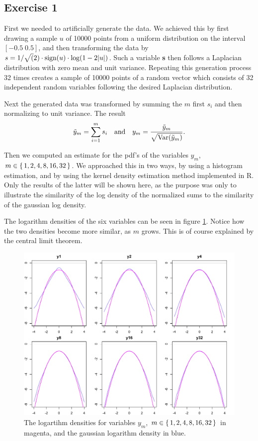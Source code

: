\documentclass{article}
\begin{document}
\subsection{Exercise 1}
First we needed to artificially generate the data. We achieved this by
first drawing a sample $u$ of 10000 points from a uniform distribution on
the interval $[-0.5 \; 0.5]$, and then transforming the data by $s =
1/\sqrt(2) \cdot \textup{sign}(u) \cdot \log(1-2|u|)$. Such a variable
\textbf{s} then follows a Laplacian distribution with zero mean and
unit variance. Repeating this generation process 32 times creates a
sample of 10000 points of a random vector which consists of 32 independent random
variables following the desired Laplacian distribution.

Next the generated data was transformed by summing the $m$ first $s_i$
and then normalizing to unit variance. The result
\[ \tilde{y}_m = \sum_{i = 1}^m s_i \quad \textrm{and} \quad y_m =
\frac{\tilde{y}_m}{\sqrt{\textup{Var}(\tilde{y}_m)}}.
\]

Then we computed an estimate for the pdf's of the variables $y_m$, $m
\in \set{1,2,4,8,16,32}$. We approached this in two ways, by using a
histogram estimation, and by using the kernel density estimation
method implemented in R. Only the results of the latter will be shown
here, as the purpose was only to illustrate the similarity of the log
density of the normalized sums to the similarity of the gaussian log
density.

The logarithm densities of the six variables can be seen in figure
\ref{fig:logDensE221}.  Notice how the two densities become more
similar, as $m$ grows. This is of course explained by the central
limit theorem.

\begin{figure}\centering
	\includegraphics[totalheight=0.5\textheight]{logDensE221.pdf}
	\caption{The logartihm densities for variables $y_m$, $m \in
          \set{1,2,4,8,16,32}$ in magenta, and the gaussian logarithm density
          in blue.} \label{fig:logDensE221}
\end{figure}
\end{document}
